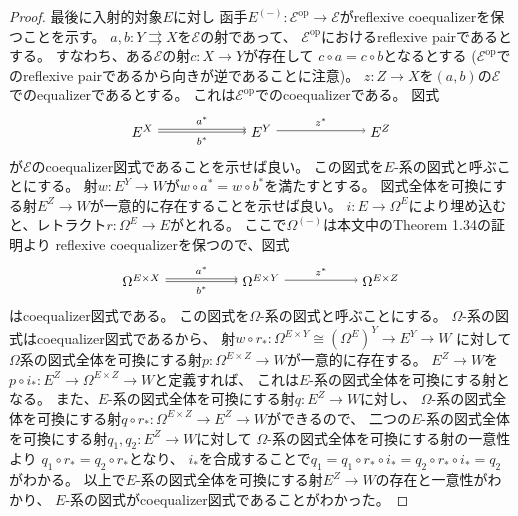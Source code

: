 \documentclass[uplatex]{jsarticle}
\theoremstyle{definition}
\newcommand{\op}{\mathrm{op}}
\def\mcE{\mathcal{E}}
\begin{document}
\begin{proof}
  最後に入射的対象\(E\)に対し
  函手\(E^{(-)}:\mcE^{\op} \to \mcE\)がreflexive coequalizerを保つことを示す。
  \(a,b:Y\rightrightarrows X\)を\(\mcE\)の射であって、
  \(\mcE^{\op}\)におけるreflexive pairであるとする。
  すなわち、ある\(\mcE\)の射\(c:X\to Y\)が存在して
  \(c\circ a = c\circ b\)となるとする
  (\(\mcE^{\op}\)でのreflexive pairであるから向きが逆であることに注意)。
  \(z:Z \to X\)を\((a,b)\)の\(\mcE\)でのequalizerであるとする。
  これは\(\mcE^{\op}\)でのcoequalizerである。
  図式
  \[
  \begin{tikzpicture}[auto]
    \node (A) at (0,0) {\(E^X\)};
    \node (B) at (3,0) {\(E^Y\)};
    \node (C) at (6,0) {\(E^Z\)};
    \draw[->,transform canvas={yshift=1pt}] (A) to node {\(\scriptstyle a^*\)} (B);
    \draw[->,transform canvas={yshift=-1pt}] (A) to node[swap] {\(\scriptstyle b^*\)} (B);
    \draw[->] (B) to node {\(\scriptstyle z^*\)} (C);
  \end{tikzpicture}
  \]
  が\(\mcE\)のcoequalizer図式であることを示せば良い。
  この図式を\(E\)-系の図式と呼ぶことにする。
  射\(w:E^Y \to W\)が\(w\circ a^* = w\circ b^*\)を満たすとする。
  図式全体を可換にする射\(E^Z\to W\)が一意的に存在することを示せば良い。
  \(i:E\to \Omega^E\)により埋め込むと、レトラクト\(r:\Omega^E\to E\)がとれる。
  ここで\(\Omega^{(-)}\)は本文中のTheorem 1.34の証明より
  reflexive coequalizerを保つので、図式
  \[
  \begin{tikzpicture}[auto]
    \node (A) at (0,0) {\(\Omega^{E\times X}\)};
    \node (B) at (3,0) {\(\Omega^{E\times Y}\)};
    \node (C) at (6,0) {\(\Omega^{E\times Z}\)};
    \draw[->,transform canvas={yshift=1pt}] (A) to node {\(\scriptstyle a^*\)} (B);
    \draw[->,transform canvas={yshift=-1pt}] (A) to node[swap] {\(\scriptstyle b^*\)} (B);
    \draw[->] (B) to node {\(\scriptstyle z^*\)} (C);
  \end{tikzpicture}
  \]
  はcoequalizer図式である。
  この図式を\(\Omega\)-系の図式と呼ぶことにする。
  \(\Omega\)-系の図式はcoequalizer図式であるから、
  射\(w \circ r_*:\Omega^{E\times Y}\cong (\Omega^E)^Y \to E^Y \to W\)
  に対して\(\Omega\)系の図式全体を可換にする射\(p:\Omega^{E\times Z}\to W\)が一意的に存在する。
  \(E^Z \to W\)を\(p\circ i_*:E^Z \to \Omega^{E\times Z} \to W\)と定義すれば、
  これは\(E\)-系の図式全体を可換にする射となる。
  また、\(E\)-系の図式全体を可換にする射\(q:E^Z\to W\)に対し、
  \(\Omega\)-系の図式全体を可換にする射\(q\circ r_* : \Omega^{E\times Z} \to E^Z \to W\)ができるので、
  二つの\(E\)-系の図式全体を可換にする射\(q_1,q_2:E^Z\to W\)に対して
  \(\Omega\)-系の図式全体を可換にする射の一意性より
  \(q_1\circ r_* = q_2 \circ r_*\)となり、
  \(i_*\)を合成することで\(q_1 = q_1\circ r_* \circ i_* = q_2\circ r_* \circ i_* = q_2\)
  がわかる。
  以上で\(E\)-系の図式全体を可換にする射\(E^Z\to W\)の存在と一意性がわかり、
  \(E\)-系の図式がcoequalizer図式であることがわかった。
\end{proof}
\end{document}
